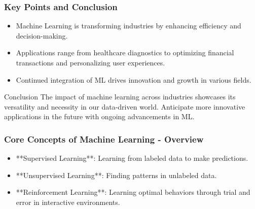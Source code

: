 \documentclass{beamer}
\begin{document}
\begin{frame}[fragile]
    \frametitle{Key Points and Conclusion}
    \begin{itemize}
        \item Machine Learning is transforming industries by enhancing efficiency and decision-making.
        \item Applications range from healthcare diagnostics to optimizing financial transactions and personalizing user experiences.
        \item Continued integration of ML drives innovation and growth in various fields.
    \end{itemize}

    \begin{block}{Conclusion}
        The impact of machine learning across industries showcases its versatility and necessity in our data-driven world. 
        Anticipate more innovative applications in the future with ongoing advancements in ML.
    \end{block}
\end{frame}

\begin{frame}[fragile]
    \frametitle{Core Concepts of Machine Learning - Overview}
    \begin{itemize}
        \item **Supervised Learning**: Learning from labeled data to make predictions.
        \item **Unsupervised Learning**: Finding patterns in unlabeled data.
        \item **Reinforcement Learning**: Learning optimal behaviors through trial and error in interactive environments.
    \end{itemize}
\end{frame}
\end{document}
